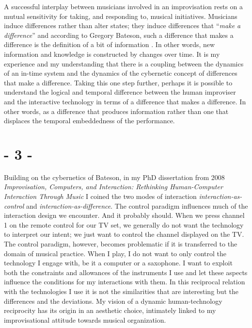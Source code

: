 \documentclass{article}
\begin{document}
A successful interplay between musicians involved in an improvisation rests on a mutual sensitivity for taking, and responding to, musical initiatives. Musicians induce differences rather than alter states; they induce differences that ``\emph{make a difference}'' and according to Gregory Bateson, such a difference that makes a difference is the definition of a bit of information \citep[92]{Bateson}. In other words, new information and knowledge is constructed by changes over time. It is my experience and my understanding that there is a coupling between the dynamics of an in-time system and the dynamics of the cybernetic concept of differences that make a difference. Taking this one step further, perhaps it is possible to understand the logical and temporal difference between the human improviser and the interactive technology in terms of a difference that makes a difference. In other words, as a difference that produces information rather than one that displaces the temporal embeddedness of the performance.



\section*{- 3 -}
\label{sec:-3-}


Building on the cybernetics of Bateson, in my PhD dissertation from 2008 \emph{Improvisation, Computers, and Interaction: Rethinking Human-Computer Interaction Through Music} \cite{frisk08} I coined the two modes of interaction \emph{interaction-as-control} and \emph{interaction-as-difference}. The control paradigm influences much of the interaction design we encounter. And it probably should. When we press channel 1 on the remote control for our TV set, we generally do not want the technology to interpret our intent; we just want to control the channel displayed on the TV. The control paradigm, however, becomes problematic if it is transferred to the domain of musical practice. When I play, I do not want to only control the technology I engage with, be it a computer or a saxophone. I want to exploit both the constraints and allowances of the instruments I use and let these aspects influence the conditions for my interactions with them. In this reciprocal relation with the technologies I use it is not the similarities that are interesting but the differences and the deviations. My vision of a dynamic human-technology reciprocity has its origin in an aesthetic choice, intimately linked to my improvisational attitude towards musical organization. 
\end{document}
